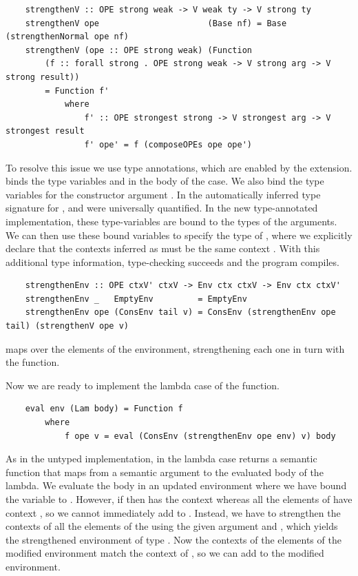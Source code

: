 \begin{lstlisting}
    strengthenV :: OPE strong weak -> V weak ty -> V strong ty
    strengthenV ope                      (Base nf) = Base (strengthenNormal ope nf)
    strengthenV (ope :: OPE strong weak) (Function 
        (f :: forall strong . OPE strong weak -> V strong arg -> V strong result)) 
        = Function f' 
            where
                f' :: OPE strongest strong -> V strongest arg -> V strongest result
                f' ope' = f (composeOPEs ope ope')
\end{lstlisting}

To resolve this issue we use type annotations, which are enabled by the  extension.  binds the type variables  and  in the body of the case. We also bind the type variables for the constructor argument . In the automatically inferred type signature for ,  and  were universally quantified. In the new type-annotated implementation, these type-variables are bound to the types of the arguments. We can then use these bound variables to specify the type of , where we explicitly declare that the contexts inferred as  must be the same context . With this additional type information, type-checking succeeds and the program compiles.

\begin{lstlisting}
    strengthenEnv :: OPE ctxV' ctxV -> Env ctx ctxV -> Env ctx ctxV'
    strengthenEnv _   EmptyEnv         = EmptyEnv
    strengthenEnv ope (ConsEnv tail v) = ConsEnv (strengthenEnv ope tail) (strengthenV ope v)
\end{lstlisting}

 maps over the elements of the environment, strengthening each one in turn with the  function.

Now we are ready to implement the lambda case of the  function.

\begin{lstlisting}
    eval env (Lam body) = Function f 
        where
            f ope v = eval (ConsEnv (strengthenEnv ope env) v) body
\end{lstlisting}

As in the untyped implementation, in the lambda case  returns a semantic function that maps from a semantic argument  to the evaluated body of the lambda. We evaluate the body in an updated environment where we have bound the variable  to . However, if  then  has the context  whereas all the elements of  have context , so we cannot immediately add  to . Instead, we have to strengthen the contexts of all the elements of the  using the given  argument and , which yields the strengthened environment of type . Now the contexts of the elements of the modified environment match the context  of , so we can add  to the modified environment. 

